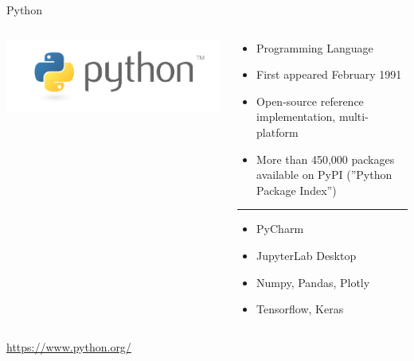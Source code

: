 \documentclass[ignorenonframetext,xcolor=dvipsnames]{beamer}
\begin{document}
\begin{frame}{Python}

\begin{columns}
\begin{column}{.25\textwidth}
\includegraphics[width=\columnwidth]{python-logo.png}
\end{column}
\begin{column}{.75\textwidth}
  \begin{itemize}
    \item Programming Language
    \item First appeared February 1991
    \item Open-source reference implementation, multi-platform
    \item More than 450,000 packages available on PyPI (''Python Package Index'')
  \end{itemize}
  \vspace{2mm} \rule{\columnwidth}{1pt}
  \vspace{2mm}
  \begin{itemize}
     \item PyCharm
     \item JupyterLab Desktop
     \item Numpy, Pandas, Plotly
     \item Tensorflow, Keras
  \end{itemize}
\end{column}
\end{columns}
  \vspace{5mm}
\url{https://www.python.org/}
\end{frame}
\end{document}
